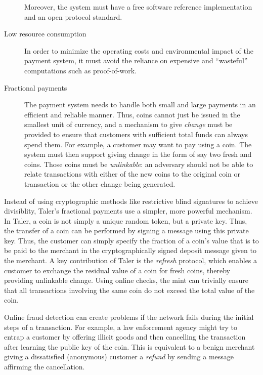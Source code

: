 \documentclass{llncs}
\begin{document}
\begin{description}
    Moreover, the system must have a free software reference
    implementation and an open protocol standard.
  \item[Low resource consumption] In order to minimize the operating
    costs and environmental impact of the payment system, it must
    avoid the reliance on expensive and ``wasteful'' computations
    such as proof-of-work.
  \item[Fractional payments] The payment system needs to handle both
    small and large payments in an efficient and reliable manner.
    Thus, coins cannot just be issued in the smallest unit of currency,
    and a mechanism to give {\em change} must be provided to ensure
    that customers with sufficient total funds can always spend them.
    For example, a customer may want to pay  using a
     coin.  The system must then support giving change in
    the form of say two fresh  and  coins.  Those
    coins must be {\em unlinkable}: an adversary should not be able to
    relate transactions with either of the new coins to the original
     coin or transaction or the other change being generated.
\end{description}

Instead of using cryptographic methods like restrictive blind
signatures to achieve divisiblity, Taler's fractional payments use a
simpler, more powerful mechanism.  In Taler, a coin is not simply a
unique random token, but a private key.  Thus, the transfer of a coin
can be performed by signing a message using this private key.  Thus,
the customer can simply specify the fraction of a coin's value that is
to be paid to the merchant in the cryptographically signed deposit
message given to the merchant.  A key contribution of Taler is the
{\em refresh} protocol, which enables a customer to exchange the
residual value of a coin for fresh coins, thereby providing unlinkable
change.  Using online checks, the mint can trivially ensure that all
transactions involving the same coin do not exceed the total value of
the coin.

Online fraud detection can create problems if the network fails during
the initial steps of a transaction.  For example, a law enforcement
agency might try to entrap a customer by offering illicit goods and
then cancelling the transaction after learning the public key of the
coin.  This is equivalent to a benign merchant giving a dissatisfied
(anonymous) customer a {\em refund} by sending a message affirming
the cancellation.
\end{document}
